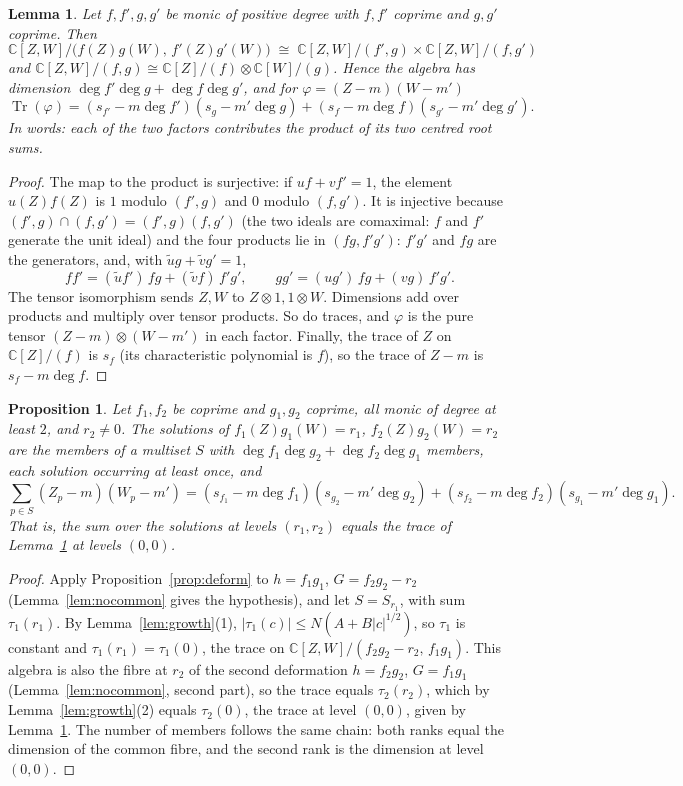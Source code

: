 \documentclass[11pt]{amsart}
\newtheorem{lemma}[theorem]{Lemma}
\newtheorem{proposition}[theorem]{Proposition}
\theoremstyle{remark}\newtheorem{remark}[theorem]{Remark}
\theoremstyle{definition}\newtheorem{example}[theorem]{Example}
\newcommand{\C}{\mathbb{C}}
\newcommand{\Tr}{\operatorname{Tr}}
\begin{document}
\begin{lemma}\label{lem:level0}
Let $f,f',g,g'$ be monic of positive degree with $f,f'$ coprime and $g,g'$ coprime. Then
\[
\C[Z,W]/\bigl(f(Z)g(W),\,f'(Z)g'(W)\bigr)\;\cong\;\C[Z,W]/(f',g)\times\C[Z,W]/(f,g')
\]
and $\C[Z,W]/(f,g)\cong\C[Z]/(f)\otimes\C[W]/(g)$.
Hence the algebra has dimension $\deg f'\deg g+\deg f\deg g'$, and for $\varphi=(Z-m)(W-m')$
\[
\Tr(\varphi)=(s_{f'}-m\deg f')(s_g-m'\deg g)+(s_f-m\deg f)(s_{g'}-m'\deg g').
\]
In words: each of the two factors contributes the product of its two centred root sums.
\end{lemma}

\begin{proof}
The map to the product is surjective: if $uf+vf'=1$, the element $u(Z)f(Z)$ is $1$ modulo $(f',g)$ and $0$ modulo
$(f,g')$. It is injective because $(f',g)\cap(f,g')=(f',g)(f,g')$ (the two ideals are comaximal: $f$ and $f'$
generate the unit ideal) and the four products lie in $(fg,f'g')$: $f'g'$ and $fg$ are the generators, and, with
$\tilde ug+\tilde vg'=1$,
\[
ff'=(\tilde uf')\,fg+(\tilde vf)\,f'g',\qquad gg'=(ug')\,fg+(vg)\,f'g'.
\]
The tensor isomorphism sends $Z,W$ to $Z\otimes1,1\otimes W$. Dimensions add over products and multiply over tensor
products. So do traces, and $\varphi$ is the pure tensor $(Z-m)\otimes(W-m')$ in each factor. Finally, the trace of
$Z$ on $\C[Z]/(f)$ is $s_f$ (its characteristic polynomial is $f$), so the trace of $Z-m$ is $s_f-m\deg f$.
\end{proof}

\begin{proposition}\label{prop:identity}
Let $f_1,f_2$ be coprime and $g_1,g_2$ coprime, all monic of degree at least $2$, and $r_2\ne0$. The solutions of
$f_1(Z)g_1(W)=r_1$, $f_2(Z)g_2(W)=r_2$ are the members of a multiset $S$ with $\deg f_1\deg g_2+\deg f_2\deg g_1$
members, each solution occurring at least once, and
\[
\sum_{p\in S}(Z_p-m)(W_p-m')=(s_{f_1}-m\deg f_1)(s_{g_2}-m'\deg g_2)+(s_{f_2}-m\deg f_2)(s_{g_1}-m'\deg g_1).
\]
That is, the sum over the solutions at levels $(r_1,r_2)$ equals the trace of Lemma~\ref{lem:level0} at levels
$(0,0)$.
\end{proposition}

\begin{proof}
Apply Proposition~\ref{prop:deform} to $h=f_1g_1$, $G=f_2g_2-r_2$ (Lemma~\ref{lem:nocommon} gives the hypothesis),
and let $S=S_{r_1}$, with sum $\tau_1(r_1)$. By Lemma~\ref{lem:growth}(1), $|\tau_1(c)|\le N(A+B|c|^{1/2})$, so
$\tau_1$ is constant and $\tau_1(r_1)=\tau_1(0)$, the trace on $\C[Z,W]/(f_2g_2-r_2,\,f_1g_1)$. This algebra is
also the fibre at $r_2$ of the second deformation $h=f_2g_2$, $G=f_1g_1$ (Lemma~\ref{lem:nocommon}, second part),
so the trace equals $\tau_2(r_2)$, which by Lemma~\ref{lem:growth}(2) equals $\tau_2(0)$, the trace at level
$(0,0)$, given by Lemma~\ref{lem:level0}. The number of members follows the same chain: both ranks equal the
dimension of the common fibre, and the second rank is the dimension at level $(0,0)$.
\end{proof}
\end{document}
